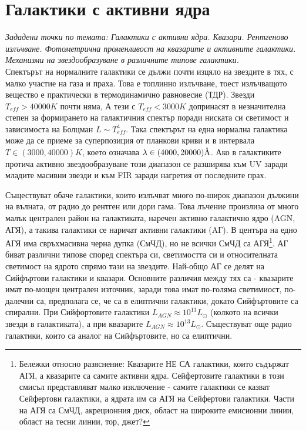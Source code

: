 \documentclass[a4paper,12pt]{article}
\let\oldAA\AA
\renewcommand{\AA}{\text{\normalfont\oldAA}}
\begin{document}
\section{Галактики с активни ядра}

\textit{Зададени точки по темата: Галактики с активни ядра. Квазари. Рентгеново излъчване. Фотометрична променливост на квазарите и активните галактики. Механизми на звездообразуване в различните типове галактики.}\\

Спектърът на нормалните галактики се дължи почти изцяло на звездите в тях, с малко участие на газа и праха. Това е топлинно излъчване, тоест излъчващото вещество е практически в термодинамично равновесие (ТДР). Звезди $T_{eff}> 40000 K$ почти няма, А тези с $T_{eff} < 3000 K$ допринасят в незначителна степен за формирането на галактичния спектър поради ниската си светимост и зависимоста на Болцман $L \sim T_{eff}^4$. Така спектърът на една нормална галактика може да се приеме за суперпозиция от планкови криви и в интервала $T \in (3000, 40000) K$, което означава $\lambda \in (4000, 20000) \mathrm{\AA}$. Ако в галактиките протича активно звездообразуване този диапазон се разширява към UV заради младите масивни звезди и към FIR заради нагретия от последните прах.

Съществуват обаче галактики, които излъчват много по-широк диапазон дължини на вълната, от радио до рентген или дори гама. Това лъчение произлиза от много малък централен район на галактиката, наречен активно галактично  ядро (AGN, АГЯ), а такива галактики се наричат активни галактики (AГ). В центъра на едно АГЯ има свръхмасивна черна дупка (СмЧД), но не всички СмЧД са АГЯ\footnote{Бележки относно разяснение: Квазарите НЕ СА галактики, които съдържат АГЯ, а квазарите са самите активни ядра. Сейфертовите галактики в този смисъл представляват малко изключение - самите галактики се казват Сейфертови галактики, а ядрата им са АГЯ на Сейфертови галактики. Части на АГЯ са СмЧД, акреционния диск, област на широките емисионни линии, област на тесни линии, тор, джет?}. АГ  биват различни типове според спектъра си, светимостта си и относителната светимост на ядрото спрямо тази на звездите. Най-общо АГ се делят на Сийфъртови галактики и квазари. Основните различия между тях са - квазарите имат по-мощен централен източник, заради това имат по-голяма светимиост, по-далечни са, предполага се, че са в елиптични галактики, докато Сийфъртовите са спирални. При Сийфортовите галактики $L_{AGN} \approx 10^{11} L_{\odot}$  (колкото на всички звезди в галактиката), а при квазарите $L_{AGN} \approx 10^{13} L_{\odot}$.  Съществуват още радио галактики, които са аналог на Сийфъртовите, но са елиптични.
 
\end{document}

